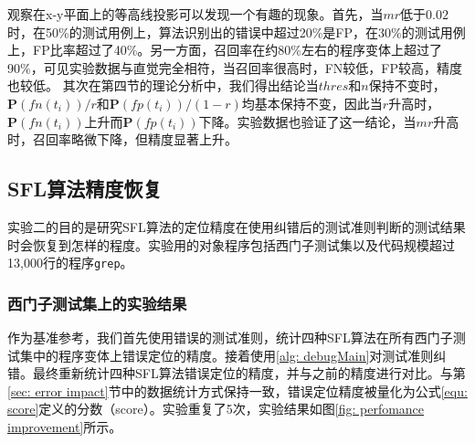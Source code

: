 观察在x-y平面上的等高线投影可以发现一个有趣的现象。首先，当$mr$低于$0.02$时，在50\%的测试用例上，算法识别出的错误中超过20\%是FP，在30\%的测试用例上，FP比率超过了40\%。另一方面，召回率在约80\%左右的程序变体上超过了90\%，可见实验数据与直觉完全相符，当召回率很高时，FN较低，FP较高，精度也较低。
其次在第四节的理论分析中，我们得出结论当$thres$和$n$保持不变时，$\mathbf{P}(fn(t_i))/r$和$\mathbf{P}(fp(t_i))/(1-r)$均基本保持不变，因此当$r$升高时，$\mathbf{P}(fn(t_i))$上升而$\mathbf{P}(fp(t_i))$下降。实验数据也验证了这一结论，当$mr$升高时，召回率略微下降，但精度显著上升。


\subsection{SFL算法精度恢复}

实验二的目的是研究SFL算法的定位精度在使用纠错后的测试准则判断的测试结果时会恢复到怎样的程度。实验用的对象程序包括西门子测试集以及代码规模超过13,000行的程序\texttt{grep}。

\subsubsection{西门子测试集上的实验结果}
作为基准参考，我们首先使用错误的测试准则，统计四种SFL算法在所有西门子测试集中的程序变体上错误定位的精度。接着使用\ref{alg: debugMain}对测试准则纠错。最终重新统计四种SFL算法错误定位的精度，并与之前的精度进行对比。与第\ref{sec: error impact}节中的数据统计方式保持一致，错误定位精度被量化为公式\ref{equ: score}定义的分数（score）。实验重复了5次，实验结果如图\ref{fig: perfomance improvement}所示。

